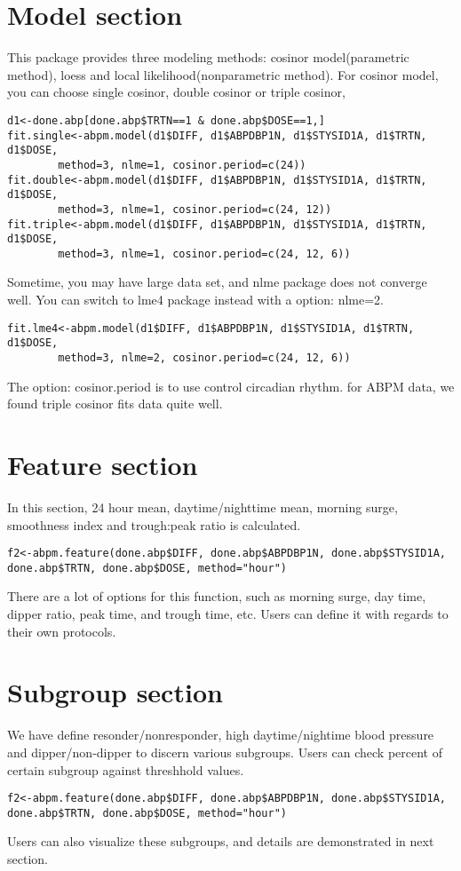 \documentclass[a4paper]{article}
\begin{document}
\section{Model section}
This package provides three modeling methods: cosinor model(parametric method),
loess and local likelihood(nonparametric method).
\newline
\newline
For cosinor model, you can choose single cosinor, double cosinor or triple cosinor,
\begin{verbatim}
d1<-done.abp[done.abp$TRTN==1 & done.abp$DOSE==1,]
fit.single<-abpm.model(d1$DIFF, d1$ABPDBP1N, d1$STYSID1A, d1$TRTN, d1$DOSE, 
		method=3, nlme=1, cosinor.period=c(24))
fit.double<-abpm.model(d1$DIFF, d1$ABPDBP1N, d1$STYSID1A, d1$TRTN, d1$DOSE, 
		method=3, nlme=1, cosinor.period=c(24, 12))
fit.triple<-abpm.model(d1$DIFF, d1$ABPDBP1N, d1$STYSID1A, d1$TRTN, d1$DOSE, 
		method=3, nlme=1, cosinor.period=c(24, 12, 6))
\end{verbatim}
\newline
\newline
Sometime, you may have large data set, and nlme package does not converge well. You can
switch to lme4 package instead with a option: nlme=2.
\begin{verbatim}
fit.lme4<-abpm.model(d1$DIFF, d1$ABPDBP1N, d1$STYSID1A, d1$TRTN, d1$DOSE, 
		method=3, nlme=2, cosinor.period=c(24, 12, 6))

\end{verbatim}
The option: cosinor.period is to use control circadian rhythm. for ABPM data,
we found triple cosinor fits data quite well.
\newline
\section{Feature section}
In this section, 24 hour mean, daytime/nighttime mean, morning surge, smoothness index
and trough:peak ratio is calculated.
\begin{verbatim}
f2<-abpm.feature(done.abp$DIFF, done.abp$ABPDBP1N, done.abp$STYSID1A, done.abp$TRTN, done.abp$DOSE, method="hour")
\end{verbatim}
There are a lot of options for this function, such as morning surge, day time, 
dipper ratio, peak time, and trough time, etc. Users can define it with
regards to their own protocols.

\section{Subgroup section}
We have define resonder/nonresponder, high daytime/nightime blood pressure and dipper/non-dipper
to discern various subgroups. Users can check percent of certain subgroup against threshhold values.
\begin{verbatim}
f2<-abpm.feature(done.abp$DIFF, done.abp$ABPDBP1N, done.abp$STYSID1A, done.abp$TRTN, done.abp$DOSE, method="hour")
\end{verbatim}
\newline
\newline
Users can also visualize these subgroups, and details are demonstrated in next section.
\end{document}

